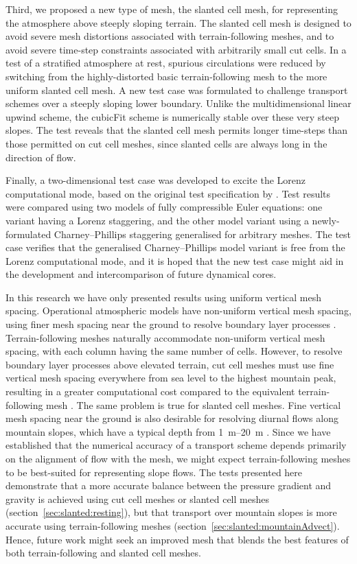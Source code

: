 Third, we proposed a new type of mesh, the slanted cell mesh, for representing the atmosphere above steeply sloping terrain.
The slanted cell mesh is designed to avoid severe mesh distortions associated with terrain-following meshes, and to avoid severe time-step constraints associated with arbitrarily small cut cells.
In a test of a stratified atmosphere at rest, spurious circulations were reduced by switching from the highly-distorted basic terrain-following mesh to the more uniform slanted cell mesh.
A new test case was formulated to challenge transport schemes over a steeply sloping lower boundary.
Unlike the multidimensional linear upwind scheme, the cubicFit scheme is numerically stable over these very steep slopes.
The test reveals that the slanted cell mesh permits longer time-steps than those permitted on cut cell meshes, since slanted cells are always long in the direction of flow.

Finally, a two-dimensional test case was developed to excite the Lorenz computational mode, based on the original test specification by \citet{arakawa-konor1996}.
Test results were compared using two models of fully compressible Euler equations: one variant having a Lorenz staggering, and the other model variant using a newly-formulated Charney--Phillips staggering generalised for arbitrary meshes.
The test case verifies that the generalised Charney--Phillips model variant is free from the Lorenz computational mode, and it is hoped that the new test case might aid in the development and intercomparison of future dynamical cores.


In this research we have only presented results using uniform vertical mesh spacing.
Operational atmospheric models have non-uniform vertical mesh spacing, using finer mesh spacing near the ground to resolve boundary layer processes \citep[p. 547]{chow2013}.
Terrain-following meshes naturally accommodate non-uniform vertical mesh spacing, with each column having the same number of cells.
However, to resolve boundary layer processes above elevated terrain, cut cell meshes must use fine vertical mesh spacing everywhere from sea level to the highest mountain peak, resulting in a greater computational cost compared to the equivalent terrain-following mesh \citep{walko-avissar2008b}.
The same problem is true for slanted cell meshes.
Fine vertical mesh spacing near the ground is also desirable for resolving diurnal flows along mountain slopes, which have a typical depth from \SIrange{1}{20}{\meter} \citep[p. 39]{chow2013}.
Since we have established that the numerical accuracy of a transport scheme depends primarily on the alignment of flow with the mesh, we might expect terrain-following meshes to be best-suited for representing slope flows.
The tests presented here demonstrate that a more accurate balance between the pressure gradient and gravity is achieved using cut cell meshes or slanted cell meshes (section~\ref{sec:slanted:resting}), but that transport over mountain slopes is more accurate using terrain-following meshes (section~\ref{sec:slanted:mountainAdvect}).
Hence, future work might seek an improved mesh that blends the best features of both terrain-following and slanted cell meshes.

